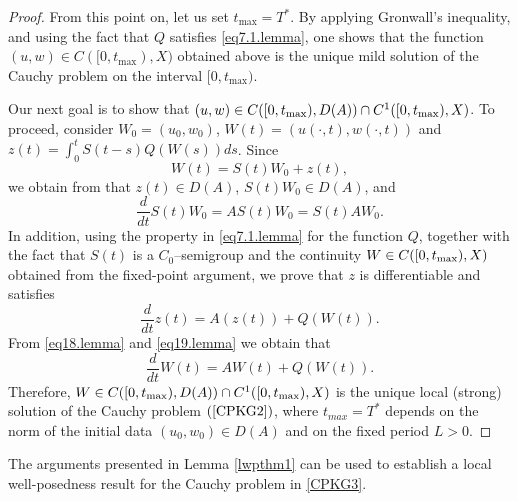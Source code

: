 \documentclass[12pt,reqno,a4paper]{amsart} %
\numberwithin{equation}{section}
\numberwithin{figure}{section}
\begin{document}
\begin{proof}
	From this point on, let us set $t_{\max} = T^{*}$. By applying Gronwall’s inequality, and using the fact that $Q$ satisfies \eqref{eq7.1.lemma}, one shows that the function $(u, w) \in C([0,t_{\max}), X)$ obtained above is the unique mild solution of the Cauchy problem on the interval $[0, t_{\max})$.
	
	Our next goal is to show that $(u,w)\in C([0,t_{\rm{max}}),D(A))\cap C^1([0,t_{\rm{max}}),X) $. To proceed, consider $W_0=(u_0, w_0)$, $W(t)= (u(\cdot, t), w(\cdot, t))$ and $ z(t)=\int_{0}^{t}S(t-s)Q(W(s))ds$. Since
	\begin{equation}\label{eq17.lemma}  
		W(t)= S(t) W_0+z(t),
	\end{equation}we obtain from
	\cite[Chapter 1, Theorem 2.4]{pazy} that $z(t)\in D(A)$, $S(t)W_0 \in D(A)$, and 
	\begin{equation}\label{eq18.lemma}  
		\frac{d}{dt}S(t) W_0=AS(t)W_0=S(t)AW_0.
	\end{equation}
	In addition, using the property in \eqref{eq7.1.lemma} for the function $Q$, together with the fact that $S(t)$ is a $C_0$–semigroup and the continuity $W\in C([0,t_{\rm max}),X)$ obtained from the fixed-point argument, we prove that $z$ is differentiable and satisfies
	\begin{equation}\label{eq19.lemma}  
		\frac{d}{dt}z(t)=A(z(t))+Q(W(t)).
	\end{equation}
	From \eqref{eq18.lemma} and \eqref{eq19.lemma} we obtain that \begin{equation}\label{eq20.lemma}  
		\frac{d}{dt}W(t)= AW(t)+Q(W(t)) . 
	\end{equation} Therefore, $ W\in C([0,t_{\rm{max}}),D(A))\cap C^1([0,t_{\rm{max}}),X)$ is the unique local (strong) solution of the Cauchy problem $(\ref{CPKG2})$, where $t_{max}=T^*$ depends on the norm of the initial data $(u_0,w_0)\in D(A)$ and on the fixed period $L>0$.	
\end{proof}
 

The arguments presented in Lemma \ref{lwpthm1} can be used to establish a local well-posedness result for the Cauchy problem in \eqref{CPKG3}.
\end{document}
